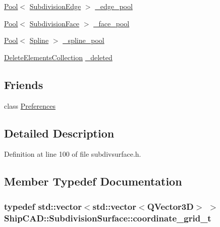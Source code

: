 \begin{DoxyCompactItemize}
\hyperlink{classPool}{Pool}$<$ \hyperlink{classShipCAD_1_1SubdivisionEdge}{Subdivision\+Edge} $>$ \hyperlink{classShipCAD_1_1SubdivisionSurface_a47d61792772139e74bebfb11eaea21a7}{\+\_\+edge\+\_\+pool}
\item 
\hyperlink{classPool}{Pool}$<$ \hyperlink{classShipCAD_1_1SubdivisionFace}{Subdivision\+Face} $>$ \hyperlink{classShipCAD_1_1SubdivisionSurface_a6064ab4cdadae400c79c4cbcba906b3a}{\+\_\+face\+\_\+pool}
\item 
\hyperlink{classPool}{Pool}$<$ \hyperlink{classShipCAD_1_1Spline}{Spline} $>$ \hyperlink{classShipCAD_1_1SubdivisionSurface_acfa427b1b9a8582382fcb2a7de95553f}{\+\_\+spline\+\_\+pool}
\item 
\hyperlink{classShipCAD_1_1DeleteElementsCollection}{Delete\+Elements\+Collection} \hyperlink{classShipCAD_1_1SubdivisionSurface_a7ffa4a7be62b7e5931dd70fce9c885ee}{\+\_\+deleted}
\end{DoxyCompactItemize}
\subsection*{Friends}
\begin{DoxyCompactItemize}
\item 
class \hyperlink{classShipCAD_1_1SubdivisionSurface_aac5731b90dac5ab98f6153447ce63674}{Preferences}
\end{DoxyCompactItemize}


\subsection{Detailed Description}


Definition at line 100 of file subdivsurface.\+h.



\subsection{Member Typedef Documentation}
\subsubsection[{\texorpdfstring{coordinate\+\_\+grid\+\_\+t}{coordinate_grid_t}}]{\setlength{\rightskip}{0pt plus 5cm}typedef std\+::vector$<$std\+::vector$<$Q\+Vector3D$>$ $>$ {\bf Ship\+C\+A\+D\+::\+Subdivision\+Surface\+::coordinate\+\_\+grid\+\_\+t}}\hypertarget{classShipCAD_1_1SubdivisionSurface_a8ed657cb7d4cd34662bd2d3e949d3e3b}{}\label{classShipCAD_1_1SubdivisionSurface_a8ed657cb7d4cd34662bd2d3e949d3e3b}


